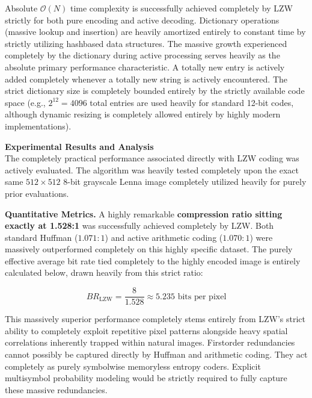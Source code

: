 Absolute $\mathcal{O}(N)$ time complexity is successfully achieved completely by LZW strictly for both pure encoding and active decoding. Dictionary operations (massive lookup and insertion) are heavily amortized entirely to constant time by strictly utilizing hashbased data structures. The massive growth experienced completely by the dictionary during active processing serves heavily as the absolute primary performance characteristic. A totally new entry is actively added completely whenever a totally new string is actively encountered. The strict dictionary size is completely bounded entirely by the strictly available code space (e.g., $2^{12} = 4096$ total entries are used heavily for standard 12-bit codes, although dynamic resizing is completely allowed entirely by highly modern implementations).

\vspace{1em}
\noindent\textbf{Experimental Results and Analysis}\mbox{}\\

The completely practical performance associated directly with LZW coding was actively evaluated. The algorithm was heavily tested completely upon the exact same $512 \times 512$ 8-bit grayscale Lenna image completely utilized heavily for purely prior evaluations.

\vspace{1em}
\noindent\textbf{Quantitative Metrics.} A highly remarkable \textbf{compression ratio sitting exactly at 1.528:1} was successfully achieved completely by LZW. Both standard Huffman ($1.071:1$) and active arithmetic coding ($1.070:1$) were massively outperformed completely on this highly specific dataset. The purely effective average bit rate tied completely to the highly encoded image is entirely calculated below, drawn heavily from this strict ratio:

\begin{equation}
    BR_{\text{LZW}} = \frac{8}{1.528} \approx 5.235 \text{ bits per pixel}
\end{equation}

This massively superior performance completely stems entirely from LZW's strict ability to completely exploit repetitive pixel patterns alongside heavy spatial correlations inherently trapped within natural images. Firstorder redundancies cannot possibly be captured directly by Huffman and arithmetic coding. They act completely as purely symbolwise memoryless entropy coders. Explicit multisymbol probability modeling would be strictly required to fully capture these massive redundancies.

